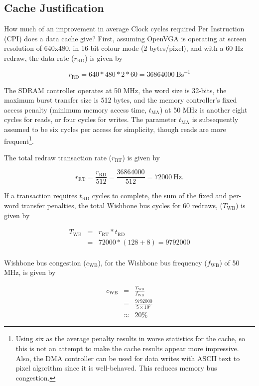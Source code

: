 \subsection{Cache Justification}
\label{CACHE_Justification}
How much of an improvement in average Clock cycles required Per
Instruction (CPI) does
a data cache give? First, assuming OpenVGA is operating at screen resolution of
640x480, in 16-bit colour mode (2 bytes/pixel), and with a 60 Hz redraw, the data
rate ($r_\mathrm{RD}$) is given by

\[
r_\mathrm{RD} = 640 * 480 * 2 * 60 = 36864000~\mathrm{Bs}^{-1}
\]

The SDRAM controller operates at 50 MHz, the word size is 32-bits, the maximum
burst transfer size is 512 bytes, and the memory controller's fixed access
penalty (minimum memory access time, $t_\mathrm{MA}$) at 50 MHz is another eight
cycles for reads, or four cycles for writes. The parameter $t_\mathrm{MA}$ is
subsequently assumed to be six cycles per access for simplicity, though reads are
more frequent\footnote{Using six as the average penalty results in worse
statistics for the cache, so this is not an attempt to make the cache results
appear more impressive. Also, the DMA controller can be used for data writes with
ASCII text to pixel algorithm since it is well-behaved. This reduces memory bus
congestion.}.

The total redraw transaction rate ($r_\mathrm{RT}$) is given by

\[
r_\mathrm{RT} = \frac{r_\mathrm{RD}}{512} = \frac{36864000}{512} =
72000~\mathrm{Hz}.
\]

If a transaction requires $t_\mathrm{RD}$ cycles to complete, the sum of the
fixed and per-word transfer penalties, the total Wishbone bus cycles for 60
redraws, ($T_\mathrm{WB}$) is given by

\begin{eqnarray*}
T_\mathrm{WB} & = & r_\mathrm{RT} * t_\mathrm{RD} \\
  & = & 72000 * (128 + 8) = 9792000 \\
\end{eqnarray*}

Wishbone bus congestion ($c_\mathrm{WB}$), for the Wishbone bus frequency
($f_\mathrm{WB}$) of 50 MHz, is given by

\begin{eqnarray*}
c_\mathrm{WB} & = & \frac{T_\mathrm{WB}}{f_\mathrm{WB}} \\
 & = & \frac{9792000}{5\times10^7} \\
 & \approx & 20\%
\end{eqnarray*}

